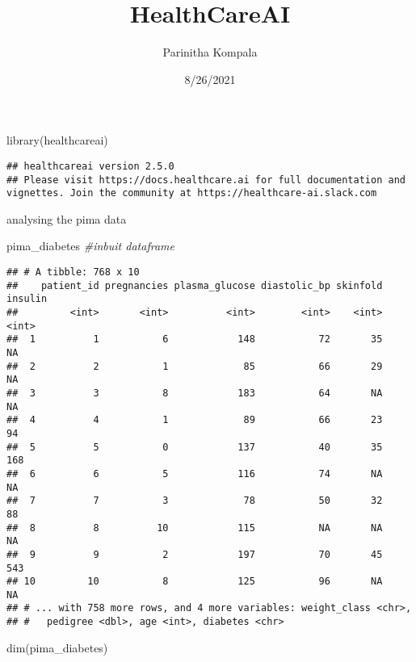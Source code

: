 \documentclass[
]{article}
\title{HealthCareAI}
\author{Parinitha Kompala}
\date{8/26/2021}
\newenvironment{Shaded}{\begin{snugshade}}{\end{snugshade}}
\newcommand{\CommentTok}[1]{\textcolor[rgb]{0.56,0.35,0.01}{\textit{#1}}}
\newcommand{\FunctionTok}[1]{\textcolor[rgb]{0.00,0.00,0.00}{#1}}
\newcommand{\NormalTok}[1]{#1}
\begin{document}
\maketitle

\begin{Shaded}
\begin{Highlighting}[]
\FunctionTok{library}\NormalTok{(healthcareai)}
\end{Highlighting}
\end{Shaded}

\begin{verbatim}
## healthcareai version 2.5.0
## Please visit https://docs.healthcare.ai for full documentation and vignettes. Join the community at https://healthcare-ai.slack.com
\end{verbatim}

analysing the pima data

\begin{Shaded}
\begin{Highlighting}[]
\NormalTok{pima\_diabetes }\CommentTok{\#inbuit dataframe}
\end{Highlighting}
\end{Shaded}

\begin{verbatim}
## # A tibble: 768 x 10
##    patient_id pregnancies plasma_glucose diastolic_bp skinfold insulin
##         <int>       <int>          <int>        <int>    <int>   <int>
##  1          1           6            148           72       35      NA
##  2          2           1             85           66       29      NA
##  3          3           8            183           64       NA      NA
##  4          4           1             89           66       23      94
##  5          5           0            137           40       35     168
##  6          6           5            116           74       NA      NA
##  7          7           3             78           50       32      88
##  8          8          10            115           NA       NA      NA
##  9          9           2            197           70       45     543
## 10         10           8            125           96       NA      NA
## # ... with 758 more rows, and 4 more variables: weight_class <chr>,
## #   pedigree <dbl>, age <int>, diabetes <chr>
\end{verbatim}

\begin{Shaded}
\begin{Highlighting}[]
\FunctionTok{dim}\NormalTok{(pima\_diabetes)}
\end{Highlighting}
\end{Shaded}
\end{document}
